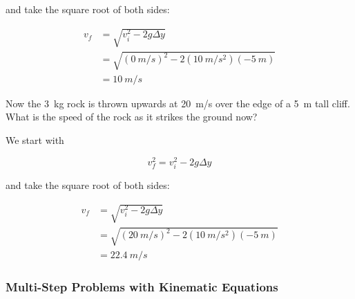 \documentclass[../main-physics-problems.tex]{subfiles}
\begin{document}
\begin{questions}
\begin{solution}
and take the square root of both sides:

\begin{align*}
    v_f &= \sqrt{v_i^2 - 2g \Delta y} \\[1ex]
    &= \sqrt{(\SI{0}{m/s})^2 - 2(\SI{10}{m/s^2})(-\SI{5}{m})} \\[1ex]
    &= \boxed{\SI{10}{m/s}}
\end{align*}
\end{solution}

\question
Now the \SI{3}{kg} rock is thrown upwards at \SI{20}{m/s} over the edge of a \SI{5}{m} tall cliff. What is the speed of the rock as it strikes the ground now?

\begin{solution}
We start with 

\begin{equation*}
    v_f^2 = v_i^2 - 2g \Delta y
\end{equation*}

and take the square root of both sides:

\begin{align*}
    v_f &= \sqrt{v_i^2 - 2g \Delta y} \\[1ex]
    &= \sqrt{(\SI{20}{m/s})^2 - 2(\SI{10}{m/s^2})(-\SI{5}{m})} \\[1ex]
    &= \boxed{\SI{22.4}{m/s}}
\end{align*}
\end{solution}


\end{questions}

\clearpage

\subsubsection{Multi-Step Problems with Kinematic Equations}
\end{document}
